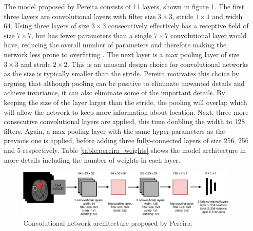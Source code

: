 \documentclass[12pt,a4paper,twoside,openright]{report}
\begin{document}
The model proposed by Pereira \cite{pereira} consists of 11 layers, shown in figure \ref{fig:pereira_model}. The first three layers are convolutional layers with filter size $3 \times 3$, stride $1 \times 1$ and width 64. Using three layers of size $3 \times 3$ consecutively effectively has a receptive field of size $7 \times 7$, but has fewer parameters than a single $7 \times 7$ convolutional layer would have, reducing the overall number of parameters and therefore making the network less prone to overfitting \cite{very_deep_conv_nets}. The next layer is a max pooling layer of size $3 \times 3$ and stride $2 \times 2$. This is an unusual design choice for convolutional networks as the size is typically smaller than the stride. Pereira motivates this choice by arguing that although pooling can be positive to eliminate unwanted details and achieve invariance, it can also eliminate some of the important details. By keeping the size of the layer larger than the stride, the pooling will overlap which will allow the network to keep more information about location. Next, three more consecutive convolutional layers are applied, this time doubling the width to 128 filters. Again, a max pooling layer with the same hyper-parameters as the previous one is applied, before adding three fully-connected layers of size 256, 256 and 5 respectively. Table \ref{table:pereira_weights} shows the model architecture in more details including the number of weights in each layer. 

\begin{figure}
	\centering
	\includegraphics[width=\textwidth]{pereira_model}
	\caption{Convolutional network architecture proposed by Pereira.}
	\label{fig:pereira_model}
\end{figure}
\end{document}
